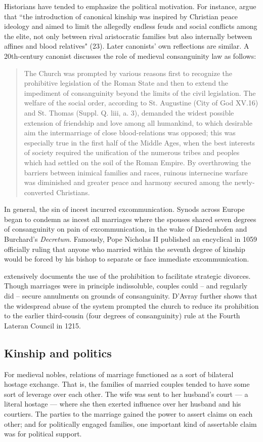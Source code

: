 \documentclass[12pt]{article}
\theoremstyle{definition}
\theoremstyle{remark}
\begin{document}
Historians have tended to emphasize the political motivation. For instance, \citet{esmark_2020} argue that ``the introduction of canonical kinship was inspired by Christian peace ideology and aimed to limit the allegedly endless feuds and social conflicts among the elite, not only between rival aristocratic families but also internally between affines and blood relatives" (23). Later canonists' own reflections are similar. A 20th-century canonist discusses the role of medieval consanguinity law as follows:
\begin{quote}
    The Church was prompted by various reasons first to recognize the prohibitive legislation of the Roman State and then to extend the impediment of consanguinity beyond the limits of the civil legislation. The welfare of the social order, according to St. Augustine (City of God XV.16) and St. Thomas (Suppl. Q. liii, a. 3), demanded the widest possible extension of friendship and love among all humankind, to which desirable aim the intermarriage of close blood-relations was opposed; this was especially true in the first half of the Middle Ages, when the best interests of society required the unification of the numerous tribes and peoples which had settled on the soil of the Roman Empire. By overthrowing the barriers between inimical families and races, ruinous internecine warfare was diminished and greater peace and harmony secured among the newly-converted Christians. \citep{burtsell_1908}
\end{quote}

In general, the sin of incest incurred excommunication. Synods across Europe began to condemn as incest all marriages where the spouses shared seven degrees of consanguinity on pain of excommunication, in the wake of Diedenhofen and Burchard's \textit{Decretum}. Famously, Pope Nicholas II published an encyclical in 1059 officially ruling that anyone who married within the seventh degree of kinship would be forced by his bishop to separate or face immediate excommunication.

\citet{davray_2005, davray_2014, davray_2015} extensively documents the use of the prohibition to facilitate strategic divorces. Though marriages were in principle indissoluble, couples could -- and regularly did -- secure annulments on grounds of consanguinity. D'Avray further shows that the widespread abuse of the system prompted the church to reduce its prohibition to the earlier third-cousin (four degrees of consanguinity) rule at the Fourth Lateran Council in 1215.

\subsection{Kinship and politics}
For medieval nobles, relations of marriage functioned as a sort of bilateral hostage exchange. That is, the families of married couples tended to have some sort of leverage over each other. The wife was sent to her husband's court — a literal hostage — where she then exerted influence over her husband and his courtiers. The parties to the marriage gained the power to assert claims on each other; and for politically engaged families, one important kind of assertable claim was for political support.
\end{document}
